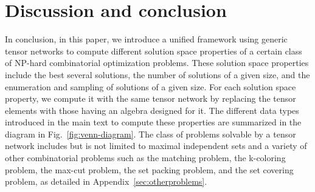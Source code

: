 \documentclass[onefignum, onetabnum]{siamart190516}
\newcommand{\<}{\langle}
\renewcommand{\>}{\rangle}
\newcommand{\Fig}[1]{Fig.~\ref{#1}}
\newcommand{\App}[1]{Appendix~\ref{#1}}
\newcounter{example}
\begin{document}
\section{Discussion and conclusion}
In conclusion, in this paper, we introduce a unified framework using generic tensor networks to compute different solution space properties of a certain class of NP-hard combinatorial optimization problems.
These solution space properties include the best several solutions, the number of solutions of a given size, and the enumeration and sampling of solutions of a given size.
For each solution space property, we compute it with the same tensor network by replacing the tensor elements with those having an algebra designed for it.
The different data types introduced in the main text to compute these properties are summarized in the diagram in \Fig{fig:venn-diagram}.
The class of problems solvable by a tensor network includes but is not limited to maximal independent sets and a variety of other combinatorial problems such as the matching problem, the k-coloring problem, the max-cut problem, the set packing problem, and the set covering problem, as detailed in \App{sec:otherproblems}. 

\end{document}
